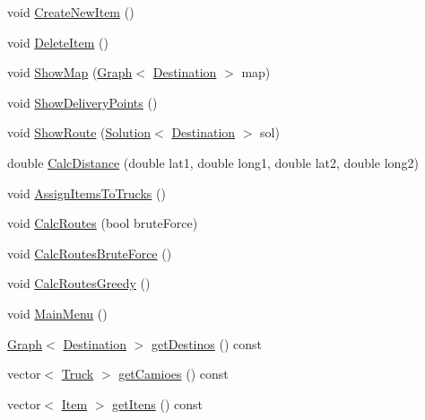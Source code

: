 \begin{DoxyCompactItemize}
\item 
void \hyperlink{class_company_ae1c6387bd19d79457cdb6d892e2e8f84}{Create\+New\+Item} ()
\item 
void \hyperlink{class_company_a9b022d1c50c3dc1c4255779c626d1aea}{Delete\+Item} ()
\item 
void \hyperlink{class_company_ad434315ec4c1b1ba2c7a993927ff8b27}{Show\+Map} (\hyperlink{class_graph}{Graph}$<$ \hyperlink{class_destination}{Destination} $>$ map)
\item 
void \hyperlink{class_company_ab6eff3463be6f83fffe612b9b6783361}{Show\+Delivery\+Points} ()
\item 
void \hyperlink{class_company_a4d8756bccc8a9c09c64f6e8b865d4936}{Show\+Route} (\hyperlink{struct_solution}{Solution}$<$ \hyperlink{class_destination}{Destination} $>$ sol)
\item 
double \hyperlink{class_company_acd997232441d4864a78171a94ea224d4}{Calc\+Distance} (double lat1, double long1, double lat2, double long2)
\item 
void \hyperlink{class_company_aed2297d6ef23fcb856949e71ac3b2232}{Assign\+Items\+To\+Trucks} ()
\item 
void \hyperlink{class_company_a8f768044af804983b36d25d4c31d34cc}{Calc\+Routes} (bool brute\+Force)
\item 
void \hyperlink{class_company_a39bfbc6302cd01d21105413086bd95da}{Calc\+Routes\+Brute\+Force} ()
\item 
void \hyperlink{class_company_a902b230a634cf369612dd4c6d67c9288}{Calc\+Routes\+Greedy} ()
\item 
void \hyperlink{class_company_a293db497700dd7dc96994bedb41f7e2b}{Main\+Menu} ()
\item 
\hyperlink{class_graph}{Graph}$<$ \hyperlink{class_destination}{Destination} $>$ \hyperlink{class_company_a686434a465ce82214d0ef00d1833781f}{get\+Destinos} () const 
\item 
vector$<$ \hyperlink{class_truck}{Truck} $>$ \hyperlink{class_company_ae142878871ffe97d1254250c93e26355}{get\+Camioes} () const 
\item 
vector$<$ \hyperlink{class_item}{Item} $>$ \hyperlink{class_company_aef1ef407a2701b108e98e5daa84c0b8e}{get\+Itens} () const 
\end{DoxyCompactItemize}
